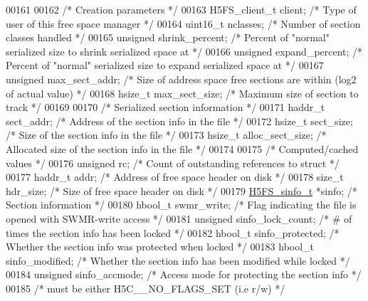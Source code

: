 \begin{DoxyCode}
00161 
00162     \textcolor{comment}{/* Creation parameters */}
00163     H5FS\_client\_t client;       \textcolor{comment}{/* Type of user of this free space manager    */}
00164     uint16\_t nclasses;         \textcolor{comment}{/* Number of section classes handled          */}
00165     \textcolor{keywordtype}{unsigned} shrink\_percent;    \textcolor{comment}{/* Percent of "normal" serialized size to shrink serialized space at */}
00166     \textcolor{keywordtype}{unsigned} expand\_percent;    \textcolor{comment}{/* Percent of "normal" serialized size to expand serialized space at */}
00167     \textcolor{keywordtype}{unsigned} max\_sect\_addr;     \textcolor{comment}{/* Size of address space free sections are within (log2 of actual value) */}
00168     hsize\_t max\_sect\_size;      \textcolor{comment}{/* Maximum size of section to track */}
00169 
00170     \textcolor{comment}{/* Serialized section information */}
00171     haddr\_t sect\_addr;          \textcolor{comment}{/* Address of the section info in the file    */}
00172     hsize\_t sect\_size;          \textcolor{comment}{/* Size of the section info in the file       */}
00173     hsize\_t alloc\_sect\_size;    \textcolor{comment}{/* Allocated size of the section info in the file */}
00174 
00175 \textcolor{comment}{/* Computed/cached values */}
00176     \textcolor{keywordtype}{unsigned} rc;                \textcolor{comment}{/* Count of outstanding references to struct  */}
00177     haddr\_t addr;               \textcolor{comment}{/* Address of free space header on disk       */}
00178     \textcolor{keywordtype}{size\_t} hdr\_size;            \textcolor{comment}{/* Size of free space header on disk          */}
00179     \hyperlink{struct_h5_f_s__sinfo__t}{H5FS\_sinfo\_t} *sinfo;        \textcolor{comment}{/* Section information                        */}
00180     hbool\_t swmr\_write;         \textcolor{comment}{/* Flag indicating the file is opened with SWMR-write access */}
00181     \textcolor{keywordtype}{unsigned} sinfo\_lock\_count;  \textcolor{comment}{/* # of times the section info has been locked */}
00182     hbool\_t sinfo\_protected;    \textcolor{comment}{/* Whether the section info was protected when locked */}
00183     hbool\_t sinfo\_modified;     \textcolor{comment}{/* Whether the section info has been modified while locked */}
00184     \textcolor{keywordtype}{unsigned} sinfo\_accmode;     \textcolor{comment}{/* Access mode for protecting the section info */}
00185                                 \textcolor{comment}{/* must be either H5C\_\_NO\_FLAGS\_SET (i.e r/w)  */}

\end{DoxyCode}
